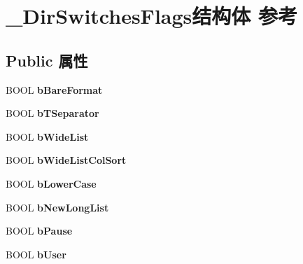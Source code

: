 \hypertarget{struct___dir_switches_flags}{}\section{\+\_\+\+Dir\+Switches\+Flags结构体 参考}
\label{struct___dir_switches_flags}
\subsection*{Public 属性}
\begin{DoxyCompactItemize}
\item 
\mbox{\label{struct___dir_switches_flags_a34e93e02adf3a043f6124f911845fb27}} 
B\+O\+OL {\bfseries b\+Bare\+Format}
\item 
\mbox{\label{struct___dir_switches_flags_afd39a90878c1b8d8e537e0619f8957b7}} 
B\+O\+OL {\bfseries b\+T\+Separator}
\item 
\mbox{\label{struct___dir_switches_flags_a5a9c65f3e7ace1aeb812359804511b98}} 
B\+O\+OL {\bfseries b\+Wide\+List}
\item 
\mbox{\label{struct___dir_switches_flags_a33a42bf752519a82beefc53ad0b9e4e5}} 
B\+O\+OL {\bfseries b\+Wide\+List\+Col\+Sort}
\item 
\mbox{\label{struct___dir_switches_flags_a9a587c98c31c48d26a4e9a0923161567}} 
B\+O\+OL {\bfseries b\+Lower\+Case}
\item 
\mbox{\label{struct___dir_switches_flags_a258e983422a6ca6d75c7db08db979a96}} 
B\+O\+OL {\bfseries b\+New\+Long\+List}
\item 
\mbox{\label{struct___dir_switches_flags_ac9b7699bb414a2f1e5e5fe428f025da9}} 
B\+O\+OL {\bfseries b\+Pause}
\item 
\mbox{\label{struct___dir_switches_flags_ad78f9f6ec7f3c26b53cd3742d7ebf635}} 
B\+O\+OL {\bfseries b\+User}
\item 
\mbox{\label{struct___dir_switches_flags_a1c94dfa05ce4f011c2ab0596e475e57c}} 

\end{DoxyCompactItemize}

